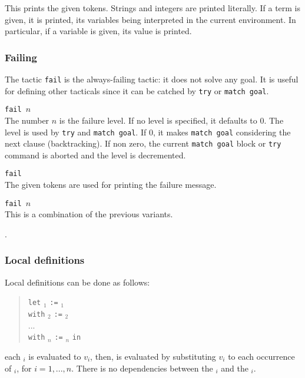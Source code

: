 
This prints the given tokens. Strings and integers are printed
literally. If a term is given, it is printed, its variables being
interpreted in the current environment. In particular, if a variable
is given, its value is printed.


\subsubsection[Failing]{Failing
}

The tactic {\tt fail} is the always-failing tactic: it does not solve
any goal. It is useful for defining other tacticals since it can be
catched by {\tt try} or {\tt match goal}. 

\begin{Variants}
\item {\tt fail $n$}\\
The number $n$ is the failure level. If no level is specified, it
defaults to $0$.  The level is used by {\tt try} and {\tt match goal}.
If $0$, it makes {\tt match goal} considering the next clause
(backtracking). If non zero, the current {\tt match goal} block or
{\tt try} command is aborted and the level is decremented.

\item {\tt fail \nelist{\messagetoken}{}}\\
The given tokens are used for printing the failure message.

\item {\tt fail $n$ \nelist{\messagetoken}{}}\\
This is a combination of the previous variants.
\end{Variants}

\ErrMsg {}.

\subsubsection[Local definitions]{Local definitions
}

Local definitions can be done as follows:
\begin{quote}
{\tt let} {\ident}$_1$ {\tt :=} {\tacexpr}$_1$\\
{\tt with} {\ident}$_2$ {\tt :=} {\tacexpr}$_2$\\
...\\
{\tt with} {\ident}$_n$ {\tt :=} {\tacexpr}$_n$ {\tt in}\\
{\tacexpr}
\end{quote}
each {\tacexpr}$_i$ is evaluated to $v_i$, then, {\tacexpr} is
evaluated by substituting $v_i$ to each occurrence of {\ident}$_i$,
for $i=1,...,n$. There is no dependencies between the {\tacexpr}$_i$
and the {\ident}$_i$.

